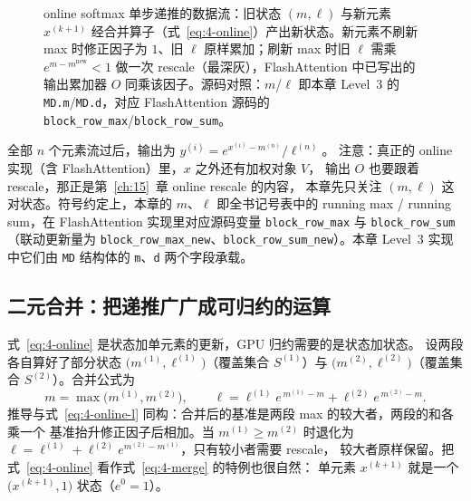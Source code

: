 \begin{figure}[htbp]
\caption{online softmax 单步递推的数据流：旧状态 $(m,\ell)$ 与新元素 $x^{(k+1)}$ 经合并算子（式~\ref{eq:4-online}）产出新状态。新元素不刷新 max 时修正因子为 $1$、旧 $\ell$ 原样累加；刷新 max 时旧 $\ell$ 需乘 $e^{m-m^{\mathrm{new}}} < 1$ 做一次 rescale（最深灰），FlashAttention 中已写出的输出累加器 $O$ 同乘该因子。源码对照：$m$/$\ell$ 即本章 Level~3 的 \texttt{MD.m}/\texttt{MD.d}，对应 FlashAttention 源码的 \texttt{block\_row\_max}/\texttt{block\_row\_sum}。}
\label{fig:4-2}
\end{figure}

全部 $n$ 个元素流过后，输出为 $y^{(i)} = e^{x^{(i)} - m^{(n)}} / \ell^{(n)}$。
注意：真正的 online 实现（含 FlashAttention）里，$x$ 之外还有加权对象 $V$，
输出 $O$ 也要跟着 rescale，那正是第~\ref{ch:15}~章 online rescale 的内容，
本章先只关注 $(m, \ell)$ 这对状态。符号约定上，本章的 $m$、$\ell$ 即全书记号表中的
running max / running sum，在 FlashAttention 实现里对应源码变量
\texttt{block\_\allowbreak{}row\_\allowbreak{}max} 与 \texttt{block\_\allowbreak{}row\_\allowbreak{}sum}（联动更新量为
\texttt{block\_\allowbreak{}row\_\allowbreak{}max\_\allowbreak{}new}、\texttt{block\_\allowbreak{}row\_\allowbreak{}sum\_\allowbreak{}new}）。本章 Level~3
实现中它们由 \texttt{MD} 结构体的 \texttt{m}、\texttt{d} 两个字段承载。

\subsection{二元合并：把递推广广成可归约的运算}

式~\ref{eq:4-online} 是状态加单元素的更新，GPU 归约需要的是状态加状态。
设两段各自算好了部分状态 $\bigl(m^{(1)}, \ell^{(1)}\bigr)$（覆盖集合
$S^{(1)}$）与 $\bigl(m^{(2)}, \ell^{(2)}\bigr)$（覆盖集合 $S^{(2)}$）。合并公式为
\begin{equation}
  m = \max\bigl(m^{(1)}, m^{(2)}\bigr),
  \qquad
  \ell = \ell^{(1)} e^{\,m^{(1)} - m} + \ell^{(2)} e^{\,m^{(2)} - m} .
  \label{eq:4-merge}
\end{equation}
推导与式~\ref{eq:4-online-l} 同构：合并后的基准是两段 max 的较大者，两段的和各乘一个
基准抬升修正因子后相加。当 $m^{(1)} \ge m^{(2)}$ 时退化为
$\ell = \ell^{(1)} + \ell^{(2)} e^{m^{(2)} - m^{(1)}}$，只有较小者需要 rescale，
较大者原样保留。把式~\ref{eq:4-online} 看作式~\ref{eq:4-merge} 的特例也很自然：
单元素 $x^{(k+1)}$ 就是一个 $\bigl(x^{(k+1)}, 1\bigr)$ 状态（$e^{0}=1$）。

